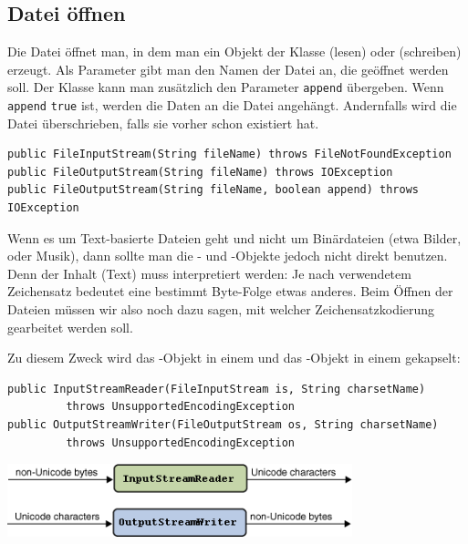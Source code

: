 \subsection{Datei öffnen}

Die Datei öffnet man, in dem man ein Objekt der Klasse 
(lesen) oder  (schreiben) erzeugt. Als Parameter gibt
man den Namen der Datei an, die geöffnet werden soll. Der Klasse
 kann man zusätzlich den Parameter \lstinline|append|
übergeben. Wenn \lstinline|append| \lstinline|true| ist, werden die Daten an die
Datei angehängt. Andernfalls wird die Datei überschrieben, falls sie
vorher schon existiert hat.

\begin{lstlisting}
public FileInputStream(String fileName) throws FileNotFoundException
public FileOutputStream(String fileName) throws IOException
public FileOutputStream(String fileName, boolean append) throws IOException
\end{lstlisting}

Wenn es um Text-basierte Dateien geht und nicht um Binärdateien (etwa Bilder,
oder Musik), dann sollte man die - und
-Objekte jedoch nicht direkt benutzen. Denn der Inhalt
(Text) muss interpretiert werden: Je nach verwendetem Zeichensatz bedeutet eine
bestimmt Byte-Folge etwas anderes. Beim Öffnen der Dateien müssen wir also noch
dazu sagen, mit welcher Zeichensatzkodierung gearbeitet werden soll.

Zu diesem Zweck wird das -Objekt in einem
 und das -Objekt in einem
 gekapselt:

\begin{lstlisting}
public InputStreamReader(FileInputStream is, String charsetName) 
         throws UnsupportedEncodingException
public OutputStreamWriter(FileOutputStream os, String charsetName) 
         throws UnsupportedEncodingException
\end{lstlisting}

\begin{center}
\includegraphics[width=0.75\textwidth]{./inf/SEKII/27_Java_Dateizugriffe/Stream-Kapselung.png}
\end{center}

